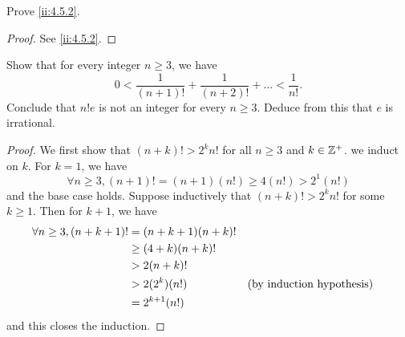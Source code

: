 \exercisesection

\begin{ex}\label{ii:ex:4.5.1}
  Prove \cref{ii:4.5.2}.
\end{ex}

\begin{proof}
  See \cref{ii:4.5.2}.
\end{proof}

\begin{ex}\label{ii:ex:4.5.2}
  Show that for every integer \(n \geq 3\), we have
  \[
    0 < \dfrac{1}{(n + 1)!} + \dfrac{1}{(n + 2)!} + \dots < \dfrac{1}{n!}.
  \]
  Conclude that \(n! e\) is not an integer for every \(n \geq 3\).
  Deduce from this that \(e\) is irrational.
\end{ex}

\begin{proof}
  We first show that \((n + k)! > 2^k n!\) for all \(n \geq 3\) and \(k \in \mathbb{Z}^+\).
  we induct on \(k\).
  For \(k = 1\), we have
  \[
    \forall n \geq 3, (n + 1)! = (n + 1) (n!) \geq 4 (n!) > 2^1 (n!)
  \]
  and the base case holds.
  Suppose inductively that \((n + k)! > 2^k n!\) for some \(k \geq 1\).
  Then for \(k + 1\), we have
  \begin{align*}
    \forall n \geq 3, (n + k + 1)! & = (n + k + 1) (n + k)!            \\
                                   & \geq (4 + k)(n + k)!              \\
                                   & > 2 (n + k)!                      \\
                                   & > 2 (2^k) (n!)         &  & \text{(by induction hypothesis)} \\
                                   & = 2^{k + 1} (n!)
  \end{align*}
  and this closes the induction.


\end{proof}
